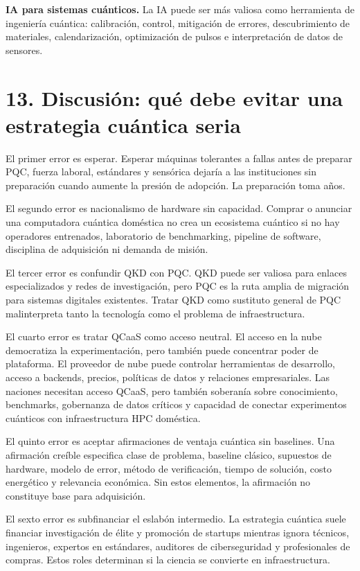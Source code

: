 \documentclass[
  11pt,
  letterpaper,
]{article}
\begin{document}
\textbf{IA para sistemas cuánticos.} La IA puede ser más valiosa como
herramienta de ingeniería cuántica: calibración, control, mitigación de
errores, descubrimiento de materiales, calendarización, optimización de
pulsos e interpretación de datos de sensores.

\section{13. Discusión: qué debe evitar una estrategia cuántica
seria}\label{discusiuxf3n-quuxe9-debe-evitar-una-estrategia-cuuxe1ntica-seria}

El primer error es esperar. Esperar máquinas tolerantes a fallas antes
de preparar PQC, fuerza laboral, estándares y sensórica dejaría a las
instituciones sin preparación cuando aumente la presión de adopción. La
preparación toma años.

El segundo error es nacionalismo de hardware sin capacidad. Comprar o
anunciar una computadora cuántica doméstica no crea un ecosistema
cuántico si no hay operadores entrenados, laboratorio de benchmarking,
pipeline de software, disciplina de adquisición ni demanda de misión.

El tercer error es confundir QKD con PQC. QKD puede ser valiosa para
enlaces especializados y redes de investigación, pero PQC es la ruta
amplia de migración para sistemas digitales existentes. Tratar QKD como
sustituto general de PQC malinterpreta tanto la tecnología como el
problema de infraestructura.

El cuarto error es tratar QCaaS como acceso neutral. El acceso en la
nube democratiza la experimentación, pero también puede concentrar poder
de plataforma. El proveedor de nube puede controlar herramientas de
desarrollo, acceso a backends, precios, políticas de datos y relaciones
empresariales. Las naciones necesitan acceso QCaaS, pero también
soberanía sobre conocimiento, benchmarks, gobernanza de datos críticos y
capacidad de conectar experimentos cuánticos con infraestructura HPC
doméstica.

El quinto error es aceptar afirmaciones de ventaja cuántica sin
baselines. Una afirmación creíble especifica clase de problema, baseline
clásico, supuestos de hardware, modelo de error, método de verificación,
tiempo de solución, costo energético y relevancia económica. Sin estos
elementos, la afirmación no constituye base para adquisición.

El sexto error es subfinanciar el eslabón intermedio. La estrategia
cuántica suele financiar investigación de élite y promoción de startups
mientras ignora técnicos, ingenieros, expertos en estándares, auditores
de ciberseguridad y profesionales de compras. Estos roles determinan si
la ciencia se convierte en infraestructura.
\end{document}
